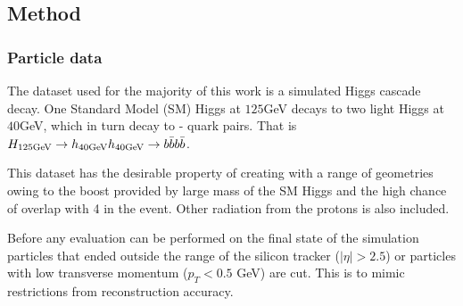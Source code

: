 \subsection{Method}
\subsubsection{Particle data}
The dataset used for the majority of this work is a simulated Higgs cascade decay.
One Standard Model (SM) Higgs at \(125\)GeV decays to two light Higgs at \(40\)GeV,
which in turn decay to \beau{}-\bbar{} quark pairs.
That is \(H_{125\text{GeV}} \rightarrow h_{40\text{GeV}} h_{40\text{GeV}} \rightarrow b \bar{b} b \bar{b}\).


This dataset has the desirable property of creating  with a range of geometries
owing to the boost provided by large mass of the SM Higgs and
the high chance of overlap with 4  in the event.
Other radiation from the protons is also included.  %


Before any evaluation can be performed on the final state of the simulation
particles that ended outside the range of the silicon tracker (\(|\eta|>2.5\))
or particles with low transverse momentum (\(p_T < 0.5\) GeV) are cut.
This is to mimic restrictions from reconstruction accuracy.

